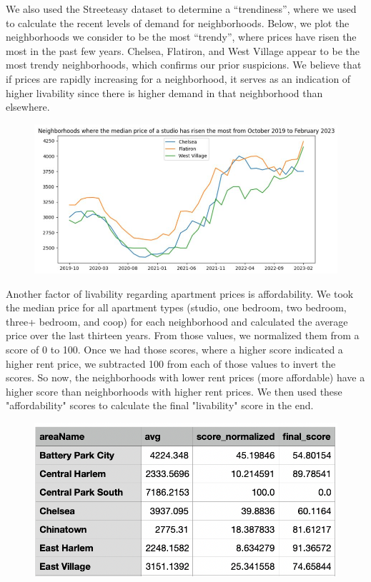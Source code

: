 \documentclass{article}
\begin{document}
We also used the Streeteasy dataset to determine a “trendiness”, where we used to calculate the recent levels of demand for neighborhoods.  Below, we plot the neighborhoods we consider to be the most “trendy”, where prices have risen the most in the past few years. Chelsea, Flatiron, and West Village appear to be the most trendy neighborhoods, which confirms our prior suspicions.  We believe that if prices are rapidly increasing for a neighborhood, it serves as an indication of higher livability since there is higher demand in that neighborhood than elsewhere.

\begin{figure}[h]
\centering
\includegraphics[scale=0.50]{init_median.JPG}
\end{figure}

Another factor of livability regarding apartment prices is affordability.  We took the median price for all apartment types (studio, one bedroom, two bedroom, three+ bedroom, and coop) for each neighborhood and calculated the average price over the last thirteen years.  From those values, we normalized them from a score of 0 to 100. Once we had those scores, where a higher score indicated a higher rent price, we subtracted 100 from each of those values to invert the scores.  So now, the neighborhoods with lower rent prices (more affordable) have a higher score than neighborhoods with higher rent prices.  We then used these "affordability" scores to calculate the final "livability" score in the end.

\begin{figure}[h]
\centering
\includegraphics[scale=0.50]{streeteasy.JPG}
\end{figure}
\end{document}
